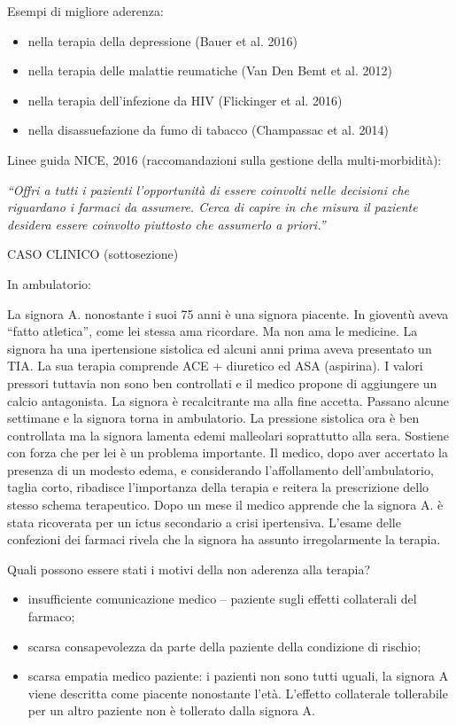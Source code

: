 \documentclass[]{article}
\begin{document}
Esempi di migliore aderenza:

\begin{itemize}
\item
  nella terapia della depressione (Bauer et al. 2016)
\item
  nella terapia delle malattie reumatiche (Van Den Bemt et al. 2012)
\item
  nella terapia dell'infezione da HIV (Flickinger et al. 2016)
\item
  nella disassuefazione da fumo di tabacco (Champassac et al. 2014)
\end{itemize}

Linee guida NICE, 2016 (raccomandazioni sulla gestione della
multi-morbidità):

\emph{``Offri a tutti i pazienti l'opportunità di essere coinvolti nelle
decisioni che riguardano i farmaci da assumere. Cerca di capire in che
misura il paziente desidera essere coinvolto piuttosto che assumerlo a
priori.''}

CASO CLINICO (sottosezione)

In ambulatorio:

La signora A. nonostante i suoi 75 anni è una signora piacente. In
gioventù aveva ``fatto atletica'', come lei stessa ama ricordare. Ma non
ama le medicine. La signora ha una ipertensione sistolica ed alcuni anni
prima aveva presentato un TIA. La sua terapia comprende ACE + diuretico
ed ASA (aspirina). I valori pressori tuttavia non sono ben controllati e
il medico propone di aggiungere un calcio antagonista. La signora è
recalcitrante ma alla fine accetta. Passano alcune settimane e la
signora torna in ambulatorio. La pressione sistolica ora è ben
controllata ma la signora lamenta edemi malleolari soprattutto alla
sera. Sostiene con forza che per lei è un problema importante. Il
medico, dopo aver accertato la presenza di un modesto edema, e
considerando l'affollamento dell'ambulatorio, taglia corto, ribadisce
l'importanza della terapia e reitera la prescrizione dello stesso schema
terapeutico. Dopo un mese il medico apprende che la signora A. è stata
ricoverata per un ictus secondario a crisi ipertensiva. L'esame delle
confezioni dei farmaci rivela che la signora ha assunto irregolarmente
la terapia.

Quali possono essere stati i motivi della non aderenza alla terapia?

\begin{itemize}
\item
  insufficiente comunicazione medico -- paziente sugli effetti
  collaterali del farmaco;
\item
  scarsa consapevolezza da parte della paziente della condizione di
  rischio;
\item
  scarsa empatia medico paziente: i pazienti non sono tutti uguali, la
  signora A viene descritta come piacente nonostante l'età. L'effetto
  collaterale tollerabile per un altro paziente non è tollerato dalla
  signora A.
\end{itemize}
\end{document}
